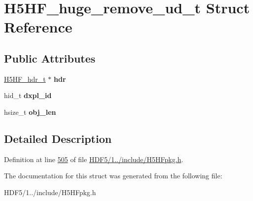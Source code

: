 \hypertarget{struct_h5_h_f__huge__remove__ud__t}{}\section{H5\+H\+F\+\_\+huge\+\_\+remove\+\_\+ud\+\_\+t Struct Reference}
\label{struct_h5_h_f__huge__remove__ud__t}
\subsection*{Public Attributes}
\begin{DoxyCompactItemize}
\item 
\mbox{\label{struct_h5_h_f__huge__remove__ud__t_afc141a782a0bf1b1ecff4dd6dfbb4d38}} 
\hyperlink{struct_h5_h_f__hdr__t}{H5\+H\+F\+\_\+hdr\+\_\+t} $\ast$ {\bfseries hdr}
\item 
\mbox{\label{struct_h5_h_f__huge__remove__ud__t_a4f9530aedf9b882dbc866acb2b941fbc}} 
hid\+\_\+t {\bfseries dxpl\+\_\+id}
\item 
\mbox{\label{struct_h5_h_f__huge__remove__ud__t_aadee5407cf8c354a9ab197b002fb581e}} 
hsize\+\_\+t {\bfseries obj\+\_\+len}
\end{DoxyCompactItemize}


\subsection{Detailed Description}


Definition at line \hyperlink{_h_d_f5_21_810_81_2include_2_h5_h_fpkg_8h_source_l00505}{505} of file \hyperlink{_h_d_f5_21_810_81_2include_2_h5_h_fpkg_8h_source}{H\+D\+F5/1../include/\+H5\+H\+Fpkg.\+h}.



The documentation for this struct was generated from the following file\+:\begin{DoxyCompactItemize}
\item 
H\+D\+F5/1../include/\+H5\+H\+Fpkg.\+h\end{DoxyCompactItemize}
